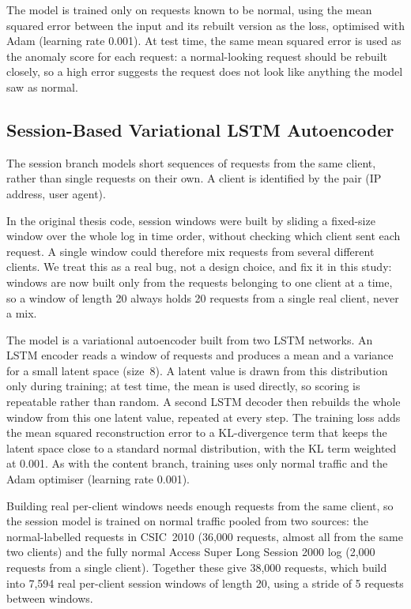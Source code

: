 \documentclass[futureinternet,article,accept,moreauthors]{Definitions/mdpi}
\begin{document}
The model is trained only on requests known to be normal, using the mean squared error between the input and its rebuilt version as the loss, optimised with Adam (learning rate 0.001). At test time, the same mean squared error is used as the anomaly score for each request: a normal-looking request should be rebuilt closely, so a high error suggests the request does not look like anything the model saw as normal.

\subsection{Session-Based Variational LSTM Autoencoder} \label{sec4.5}

The session branch models short sequences of requests from the same client, rather than single requests on their own. A client is identified by the pair (IP address, user agent).

In the original thesis code, session windows were built by sliding a fixed-size window over the whole log in time order, without checking which client sent each request. A single window could therefore mix requests from several different clients. We treat this as a real bug, not a design choice, and fix it in this study: windows are now built only from the requests belonging to one client at a time, so a window of length 20 always holds 20 requests from a single real client, never a mix.

The model is a variational autoencoder built from two LSTM networks. An LSTM encoder reads a window of requests and produces a mean and a variance for a small latent space (size~8). A latent value is drawn from this distribution only during training; at test time, the mean is used directly, so scoring is repeatable rather than random. A second LSTM decoder then rebuilds the whole window from this one latent value, repeated at every step. The training loss adds the mean squared reconstruction error to a KL-divergence term that keeps the latent space close to a standard normal distribution, with the KL term weighted at 0.001. As with the content branch, training uses only normal traffic and the Adam optimiser (learning rate 0.001).

Building real per-client windows needs enough requests from the same client, so the session model is trained on normal traffic pooled from two sources: the normal-labelled requests in CSIC~2010 (36{,}000 requests, almost all from the same two clients) and the fully normal Access Super Long Session 2000 log (2{,}000 requests from a single client). Together these give 38{,}000 requests, which build into 7{,}594 real per-client session windows of length 20, using a stride of 5 requests between windows.
\end{document}
